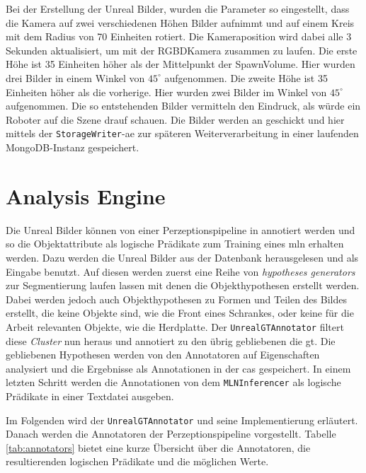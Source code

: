 Bei der Erstellung der Unreal Bilder, wurden die Parameter so eingestellt, dass die Kamera auf zwei verschiedenen Höhen Bilder aufnimmt und auf einem Kreis mit dem Radius von 70 Einheiten rotiert. Die Kameraposition wird dabei alle 3 Sekunden aktualisiert, um mit der RGBDKamera zusammen zu laufen. Die erste Höhe ist 35 Einheiten höher als der Mittelpunkt der SpawnVolume. Hier wurden drei Bilder in einem Winkel von $45^\circ$ aufgenommen. Die zweite Höhe ist 35 Einheiten höher als die vorherige. Hier wurden zwei Bilder im Winkel von $45^\circ$ aufgenommen. Die so entstehenden Bilder vermitteln den Eindruck, als würde ein Roboter auf die Szene drauf schauen. Die Bilder werden an \robosherlock geschickt und hier mittels der \texttt{StorageWriter}-\gls{ae} zur späteren Weiterverarbeitung in einer laufenden MongoDB-Instanz gespeichert.

\section{Analysis Engine}
\label{sec:analysisengine}
Die Unreal Bilder können  von einer Perzeptionspipeline in \robosherlock annotiert werden und so die Objektattribute als logische Prädikate zum Training eines \gls{mln} erhalten werden. Dazu werden die Unreal Bilder aus der Datenbank herausgelesen und als Eingabe benutzt. Auf diesen werden zuerst eine Reihe von \textit{hypotheses generators} zur Segmentierung laufen lassen mit denen die Objekthypothesen erstellt werden. Dabei werden jedoch auch Objekthypothesen zu Formen und Teilen des Bildes erstellt, die keine Objekte sind, wie die Front eines Schrankes, oder keine für die Arbeit relevanten Objekte, wie die Herdplatte. Der \texttt{UnrealGTAnnotator} filtert diese \textit{Cluster} nun heraus und annotiert zu den übrig gebliebenen die \gls{gt}. Die gebliebenen Hypothesen werden von den Annotatoren auf Eigenschaften analysiert und die Ergebnisse als Annotationen in der \gls{cas} gespeichert. In einem letzten Schritt werden die Annotationen von dem \texttt{MLNInferencer} als logische Prädikate in einer Textdatei ausgeben. \par 

Im Folgenden wird der \texttt{UnrealGTAnnotator} und seine Implementierung erläutert. Danach werden die Annotatoren der Perzeptionspipeline vorgestellt. Tabelle \ref{tab:annotators} bietet eine kurze Übersicht über die Annotatoren, die resultierenden logischen Prädikate und die möglichen Werte.

